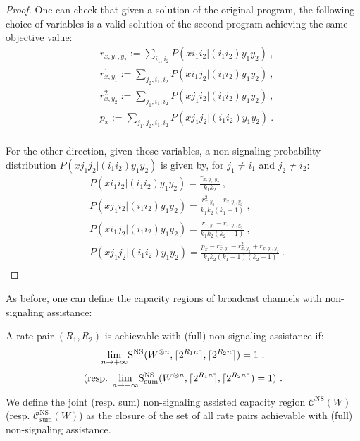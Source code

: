 \begin{proof}
  One can check that given a solution of the original program, the following choice of variables is a valid solution of the second program achieving the same objective value:
\begin{equation}
  \begin{aligned}
    &r_{x,y_1,y_2} := \sum_{i_1,i_2} P(xi_1i_2|(i_1i_2)y_1y_2)\ ,\\
    &r^1_{x,y_1} := \sum_{j_2,i_1,i_2} P(xi_1j_2|(i_1i_2)y_1y_2)\ ,\\
    &r^2_{x,y_2} := \sum_{j_1,i_1,i_2} P(xj_1i_2|(i_1i_2)y_1y_2)\ ,\\
    &p_x := \sum_{j_1,j_2,i_1,i_2} P(xj_1j_2|(i_1i_2)y_1y_2) \ .\\
  \end{aligned}
\end{equation}

For the other direction, given those variables, a non-signaling probability distribution $P(xj_1j_2|(i_1i_2)y_1y_2)$ is given by, for $j_1 \not= i_1$ and $j_2 \not= i_2$:
\begin{equation}
  \begin{aligned}
    &P(xi_1i_2|(i_1i_2)y_1y_2) = \frac{r_{x,y_1,y_2}}{k_1k_2}  \ ,\\
    &P(xj_1i_2|(i_1i_2)y_1y_2) = \frac{r^2_{x,y_2} - r_{x,y_1,y_2}}{k_1k_2(k_1-1)}  \ ,\\
    &P(xi_1j_2|(i_1i_2)y_1y_2) = \frac{r^1_{x,y_1} - r_{x,y_1,y_2}}{k_1k_2(k_2-1)} \ ,\\
    &P(xj_1j_2|(i_1i_2)y_1y_2) = \frac{p_{x} -  r^1_{x,y_1} - r^2_{x,y_2} + r_{x,y_1,y_2}}{k_1k_2(k_1-1)(k_2-1)} \ .\\
  \end{aligned}
\end{equation}
\end{proof}

As before, one can define the capacity regions of broadcast channels with non-signaling assistance:

\begin{definition}
  A rate pair $(R_1,R_2)$ is achievable with (full) non-signaling assistance if:
  \[ \underset{n \rightarrow +\infty}{\lim} \mathrm{S}^{\mathrm{NS}}(W^{\otimes n},\lceil2^{R_1n}\rceil,\lceil2^{R_2n}\rceil) = 1 \ . \]
  \[ \text{(resp. }\underset{n \rightarrow +\infty}{\lim} \mathrm{S}^{\mathrm{NS}}_{\text{sum}}(W^{\otimes n},\lceil2^{R_1n}\rceil,\lceil2^{R_2n}\rceil) = 1 )\ . \]
  We define the joint (resp. sum) non-signaling assisted capacity region $\mathcal{C}^{\mathrm{NS}}(W)$ (resp. $\mathcal{C}^{\mathrm{NS}}_{\text{sum}}(W)$) as the closure of the set of all rate pairs achievable with (full) non-signaling assistance.
\end{definition}

